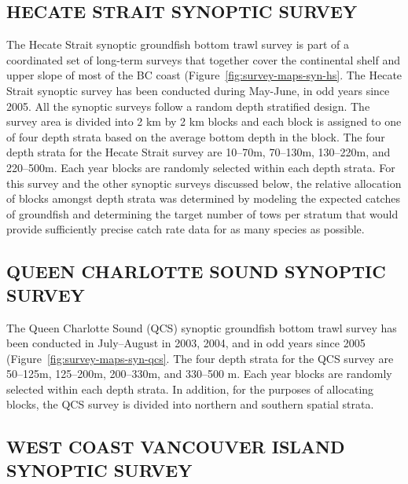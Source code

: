 \documentclass[11pt]{book}
\begin{document}
\hypertarget{hecate-strait-synoptic-survey}{%
\subsection{HECATE STRAIT SYNOPTIC SURVEY}\label{hecate-strait-synoptic-survey}}

The Hecate Strait synoptic groundfish bottom trawl survey is part of a coordinated set of long-term surveys that together cover the continental shelf and upper slope of most of the BC coast (Figure~\ref{fig:survey-maps-syn-hs}. The Hecate Strait synoptic survey has been conducted during May-June, in odd years since 2005. All the synoptic surveys follow a random depth stratified design. The survey area is divided into 2 km by 2 km blocks and each block is assigned to one of four depth strata based on the average bottom depth in the block. The four depth strata for the Hecate Strait survey are 10--70m, 70--130m, 130--220m, and 220--500m. Each year blocks are randomly selected within each depth strata. For this survey and the other synoptic surveys discussed below, the relative allocation of blocks amongst depth strata was determined by modeling the expected catches of groundfish and determining the target number of tows per stratum that would provide sufficiently precise catch rate data for as many species as possible.

\hypertarget{queen-charlotte-sound-synoptic-survey}{%
\subsection{QUEEN CHARLOTTE SOUND SYNOPTIC SURVEY}\label{queen-charlotte-sound-synoptic-survey}}

The Queen Charlotte Sound (QCS) synoptic groundfish bottom trawl survey has been conducted in July--August in 2003, 2004, and in odd years since 2005 (Figure~\ref{fig:survey-maps-syn-qcs}. The four depth strata for the QCS survey are 50--125m, 125--200m, 200--330m, and 330--500 m. Each year blocks are randomly selected within each depth strata. In addition, for the purposes of allocating blocks, the QCS survey is divided into northern and southern spatial strata.

\hypertarget{west-coast-vancouver-island-synoptic-survey}{%
\subsection{WEST COAST VANCOUVER ISLAND SYNOPTIC SURVEY}\label{west-coast-vancouver-island-synoptic-survey}}
\end{document}
